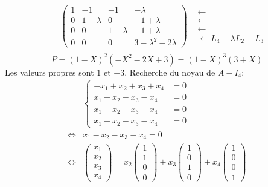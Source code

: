 \begin{align*}
\begin{aligned}
\end{aligned}
\\
&\begin{pmatrix}
  1 & -1        & -1        & -\lambda     \\
  0 & 1-\lambda & 0         & -1 + \lambda \\
  0 & 0         & 1-\lambda & -1+\lambda   \\
  0 & 0         & 0         & 3-\lambda^2 -2 \lambda
\end{pmatrix}&
\begin{aligned}
 \leftarrow  \\ \leftarrow \\ \leftarrow  \\ \leftarrow L_4 - \lambda L_2 - L_3
\end{aligned}
\\
\end{align*}
\[
  P = (1-X)^2(-X^2- 2X +3) 
  = (1-X)^3(3+X)
\]
Les valeurs propres sont $1$ et $-3$.\newline
Recherche du noyau de $A - I_4$:
\begin{align*}
  &\left\lbrace
  \begin{aligned}
    -x_1 + x_2 + x_3 + x_4 &= 0\\
    x_1 - x_2 - x_3 - x_4 &= 0\\
    x_1 - x_2 - x_3 - x_4 &= 0\\
    x_1 - x_2 - x_3 - x_4 &= 0
  \end{aligned}
  \right. \\
  \Leftrightarrow
  &    x_1 - x_2 - x_3 - x_4 = 0
  \\
  \Leftrightarrow
  &
  \begin{pmatrix}
    x_1 \\ x_2 \\ x_3 \\ x_4 
  \end{pmatrix}
  =
  x_2
  \begin{pmatrix}
    1 \\ 1 \\ 0 \\ 0
  \end{pmatrix}
  + x_3
  \begin{pmatrix}
    1 \\ 0 \\ 1 \\ 0
  \end{pmatrix}
  + x_4
  \begin{pmatrix}
    1 \\ 0 \\ 0 \\ 1
  \end{pmatrix}
\end{align*}

